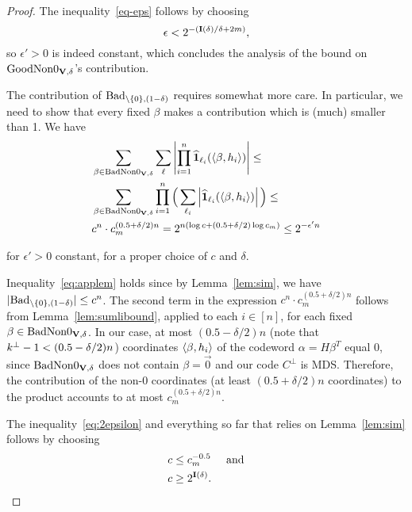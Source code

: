 \begin{proof}
The inequality~\ref{eq-eps} follows by choosing 
\begin{equation}
\epsilon < 2^{-(\mathbf{I}({\delta})/\delta+2m)} \label{epsilonBound},
\end{equation}
so $\epsilon'>0$ is indeed constant,  which concludes the analysis of the bound on $\textnormal{GoodNon0}_{\mathbf{V},\delta}$'s contribution.


The contribution of $\textnormal{Bad}_{\setminus\{0\},(1-\delta)}$ requires somewhat more care. In particular, we need to show that every fixed $\beta$ makes a contribution which is (much) smaller than 1. We have 
\begin{align}
& \sum_{\beta\in \textnormal{BadNon0}_{\mathbf{V},\delta}}\sum_{\mathbf{\ell}}\left|\prod^n_{i=1}\widehat{\mathbf{1}}_{\ell_i}(\langle\beta,h_i\rangle)\right|\leq \nonumber\\
& \sum_{\beta\in \textnormal{BadNon0}_{\mathbf{V},\delta}}\prod^n_{i=1}\Big(\sum_{\ell_i}\left|\widehat{\mathbf{1}}_{\ell_i}(\langle\beta,h_i\rangle)\right|\Big)\leq\label{eq:applem}\\
& c^n\cdot c^{(0.5 + \delta/2)n}_m = 2^{n\left( \log{c}+(0.5+\delta/2)\log{c_m} \right)}\leq 2^{-\epsilon' n}\label{eq:2epsilon}
\end{align}

for $\epsilon' >0$ constant, for a proper choice of $c$ and $\delta$.

Inequality~\ref{eq:applem} holds since by Lemma~\ref{lem:sim}, we have  $|\textnormal{Bad}_{\setminus\{0\},(1-\delta)}|\leq c^n$. The second term in the expression $c^n\cdot c^{(0.5 + \delta/2)n}_m$ follows from Lemma~\ref{lem:sumlibound}, applied to each $i\in [n]$, for each fixed $\beta\in \textnormal{BadNon0}_{\mathbf{V},\delta}$. In our case, at most $(0.5-\delta/2)n$ (note that $k^\bot-1 <(0.5-\delta/2)n$) coordinates $\langle\beta,h_i\rangle$ of the codeword $\alpha=H\beta^T$ equal 0, since $\textnormal{BadNon0}_{\mathbf{V},\delta}$ does not contain $\beta = \vec{0}$ and our code $C^\bot$ is MDS. 
Therefore, the contribution of the non-0 coordinates (at least $(0.5+\delta/2)n$ coordinates) to the product accounts to at most $c^{(0.5+\delta/2)n}_m$.


The inequality~\ref{eq:2epsilon} and everything so far that relies on Lemma~\ref{lem:sim} follows by choosing 
\begin{align}
    &c \leq c^{-0.5}_m\label{eq:11}\;\;\;\;\;\text{and}\\
    &c \geq 2^{\mathbf{I}({\delta})}.\label{eq:12} 
\end{align}


\end{proof}
